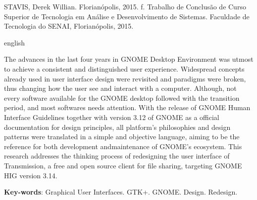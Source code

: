 \noindent STAVIS, Derek Willian. \textbf{\imprimirtitulo} Florianópolis, 2015.
\pageref{nropaginas}f. Trabalho de Conclusão de Curso Superior de Tecnologia em
Análise e Desenvolvimento de Sistemas. Faculdade de Tecnologia do SENAI,
Florianópolis, 2015.

\vspace{1cm}
\begin{resumo}
 \begin{otherlanguage*}{english}

  The advances in the last four years in GNOME Desktop Environment was utmost to
  achieve a consistent and distinguished user experience. Widespread concepts
  already used in user interface design were revisited and paradigms were
  broken, thus changing how the user see and interact with a computer. Although,
  not every software available for the GNOME desktop followed with the
  transition period, and most softwares needs attention. With the release of
  GNOME Human Interface Guidelines together with version 3.12 of GNOME as a
  official documentation for design principles, all platform's philosophies and
  design patterns were translated in a simple and objective language, aiming to
  be the reference for both development andmaintenance of GNOME's ecosystem.
  This research addresses the thinking process of redesigning the user interface
  of Transmission, a free and open source client for file sharing, targeting
  GNOME HIG version 3.14.

   \vspace{\onelineskip}

   \noindent
   \textbf{Key-words}: Graphical User Interfaces. GTK+. GNOME. Design. Redesign.
 \end{otherlanguage*}
\end{resumo}
